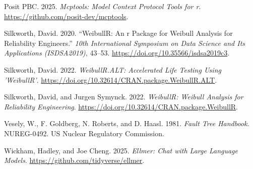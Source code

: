 \documentclass[
  letterpaper,
  DIV=11,
  numbers=noendperiod]{scrreprt}
\newlength{\cslhangindent}
\newenvironment{CSLReferences}[2] %
 {\begin{list}{}{%
  \setlength{\itemindent}{0pt}
  \setlength{\leftmargin}{0pt}
  \setlength{\parsep}{0pt}
  \ifodd #1
   \setlength{\leftmargin}{\cslhangindent}
   \setlength{\itemindent}{-1\cslhangindent}
  \fi
  \setlength{\itemsep}{#2\baselineskip}}}
 {\end{list}}
\begin{document}
\begin{CSLReferences}{1}{1}
Posit PBC. 2025. \emph{Mcptools: Model Context Protocol Tools for r}.
\url{https://github.com/posit-dev/mcptools}.

Silkworth, David. 2020. {``{WeibullR}: An r Package for Weibull Analysis
for Reliability Engineers.''} \emph{10th International Symposium on Data
Science and Its Applications (ISDSA2019)}, 43--53.
\url{https://doi.org/10.35566/isdsa2019c3}.

Silkworth, David. 2022. \emph{WeibullR.ALT: Accelerated Life Testing
Using 'WeibullR'}.
\url{https://doi.org/10.32614/CRAN.package.WeibullR.ALT}.

Silkworth, David, and Jurgen Symynck. 2022. \emph{WeibullR: Weibull
Analysis for Reliability Engineering}.
\url{https://doi.org/10.32614/CRAN.package.WeibullR}.

Vesely, W., F. Goldberg, N. Roberts, and D. Haasl. 1981. \emph{Fault
Tree Handbook}. NUREG-0492. US Nuclear Regulatory Commission.

Wickham, Hadley, and Joe Cheng. 2025. \emph{Ellmer: Chat with Large
Language Models}. \url{https://github.com/tidyverse/ellmer}.

\end{CSLReferences}
\end{document}
